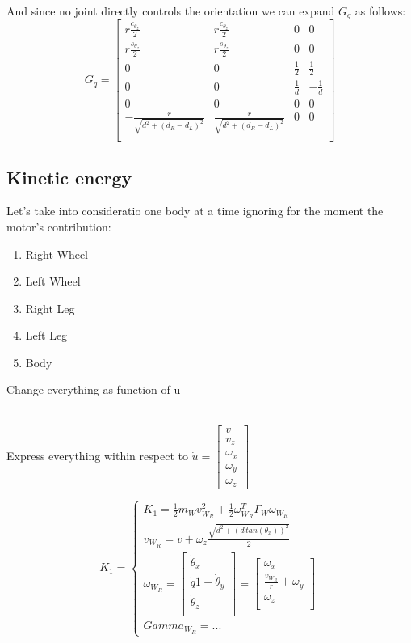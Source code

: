 \documentclass[a4paper, 7px]{article}
\begin{document}
And since no joint directly controls the orientation we can expand $G_q$ as follows:
$$G_q =  
\begin{bmatrix}
	r\frac{c_{\theta_z}}{2} & r\frac{c_{\theta_z}}{2} & 0 & 0\\
	r\frac{s_{\theta_z}}{2} & r\frac{s_{\theta_z}}{2} & 0 & 0\\
	0 & 0 & \frac{1}{2} & \frac{1}{2}\\
	0 & 0 & \frac{1}{d} & -\frac{1}{d}\\
	0 & 0 & 0 & 0\\
	-\frac{r}{\sqrt{d^2 + (d_R - d_L)^2}} & 				\frac{r}{\sqrt{d^2 + (d_R - d_L)^2}} & 0 & 0\\
\end{bmatrix}$$	

\subsection{Kinetic energy}
Let's take into consideratio one body at a time ignoring for the moment the motor's contribution: 
\begin{enumerate}
	\item Right Wheel
	\item Left Wheel
	\item Right Leg
	\item Left Leg
	\item Body
\end{enumerate}


\begin{huge}
	Change everything as function of u
\end{huge} \\


Express everything within respect to $\dot u = \begin{bmatrix}
v\\ v_z\\ \omega_x \\ \omega_y \\ \omega_z
\end{bmatrix} $

$$
K_1 =
\begin{cases}
	K_1 = \frac{1}{2} m_W v_{W_R}^2 + \frac{1}{2}\omega_{W_R}^T \Gamma_W \omega_{W_R}\\
	v_{W_R} = v + \omega_z \frac{\sqrt{d^2 + (d \, tan(\theta_x))^2}}{2}\\
	\omega_{W_R} = 
		\begin{bmatrix}
			\dot \theta_x\\
			\dot q1 + \dot \theta_y\\
			\dot \theta_z\\
		\end{bmatrix}
		=
		\begin{bmatrix}
			\omega_x\\
			\frac{v_{W_R}}{r} + \omega_y\\
			\omega_z\\
		\end{bmatrix}
		\\
		Gamma_{W_R} = ...
\end{cases}
$$
\end{document}
